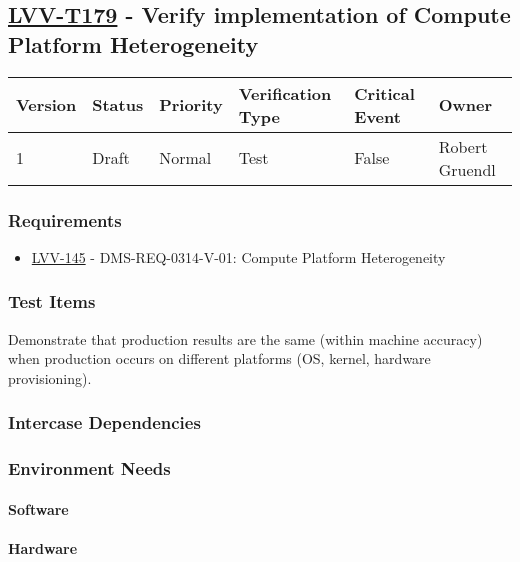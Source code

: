 \subsection{\href{https://jira.lsstcorp.org/secure/Tests.jspa\#/testCase/LVV-T179}{LVV-T179}
    - Verify implementation of Compute Platform Heterogeneity}\label{lvv-t179}

\begin{longtable}[]{llllll}
\toprule
Version & Status & Priority & Verification Type & Critical Event & Owner
\\\midrule
1 & Draft & Normal &
Test & False & Robert Gruendl
\\\bottomrule
\end{longtable}

\subsubsection{Requirements}
\begin{itemize}
\item \href{https://jira.lsstcorp.org/browse/LVV-145}{LVV-145} - DMS-REQ-0314-V-01: Compute Platform Heterogeneity
\end{itemize}

\subsubsection{Test Items}
Demonstrate that production results are the same (within machine
accuracy) when production occurs on different platforms (OS, kernel,
hardware provisioning).



\subsubsection{Intercase Dependencies}

\subsubsection{Environment Needs}

\paragraph{Software}

\paragraph{Hardware}

